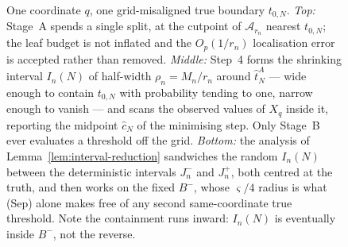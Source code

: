 \documentclass[11pt]{article}
\theoremstyle{plain}
\theoremstyle{definition}
\theoremstyle{remark}
\newcommand{\cA}{\mathcal{A}}
\begin{document}
\begin{figure}[!t]
\caption{One coordinate $q$, one grid-misaligned true boundary $t_{0,N}$.
\emph{Top:} Stage~A spends a single split, at the cutpoint of $\cA_{r_n}$
nearest $t_{0,N}$; the leaf budget is not inflated and the $O_p(1/r_n)$
localisation error is accepted rather than removed.
\emph{Middle:} Step~4 forms the shrinking interval $I_n(N)$ of half-width
$\rho_n=M_n/r_n$ around $\hat t^A_N$ --- wide enough to contain $t_{0,N}$ with
probability tending to one, narrow enough to vanish --- and scans the observed
values of $X_q$ inside it, reporting the midpoint $\hat c_N$ of the minimising
step. Only Stage~B ever evaluates a threshold off the grid.
\emph{Bottom:} the analysis of Lemma~\ref{lem:interval-reduction} sandwiches
the random $I_n(N)$ between the deterministic intervals $J_n^-$ and $J_n^+$,
both centred at the truth, and then works on the fixed $B^-$, whose
$\varsigma/4$ radius is what (Sep) alone makes free of any second
same-coordinate true threshold. Note the containment runs inward: $I_n(N)$ is
eventually inside $B^-$, not the reverse.}
\label{fig:stagea-stageb-1d}
\end{figure}
\end{document}
